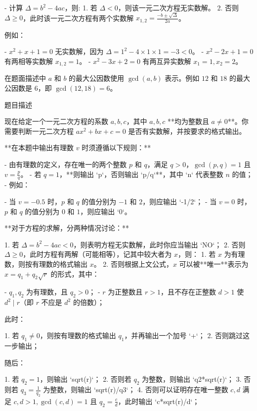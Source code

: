 \documentclass[12pt,twiside,a4paper]{ctexbook}
\numberwithin{chapter}{part}
\begin{document}
- 计算 $\Delta = b ^ 2 - 4ac$，则:
	1. 若 $\Delta < 0$，则该一元二次方程无实数解。
  	2. 否则 $\Delta \geq 0$，此时该一元二次方程有两个实数解 $x _ {1, 2} = \frac{-b \pm \sqrt \Delta}{2a}$。
 
例如：

- $x ^ 2 + x + 1 = 0$ 无实数解，因为 $\Delta = 1 ^ 2 - 4 \times 1 \times 1 = -3 < 0$。
- $x ^ 2 - 2x + 1 = 0$ 有两相等实数解 $x _ {1, 2} = 1$。
- $x ^ 2 - 3x + 2 = 0$ 有两互异实数解 $x _ 1 = 1, x _ 2 = 2$。

在题面描述中 $a$ 和 $b$ 的最大公因数使用 $\gcd(a, b)$ 表示。例如 $12$ 和 $18$ 的最大公因数是 $6$，即 $\gcd(12, 18) = 6$。

 题目描述

现在给定一个一元二次方程的系数 $a, b, c$，其中 $a, b, c$ **均为整数且 $a \neq 0$**。你需要判断一元二次方程 $a x ^ 2 + bx + c = 0$ 是否有实数解，并按要求的格式输出。

**在本题中输出有理数 $v$ 时须遵循以下规则：**

- 由有理数的定义，存在唯一的两个整数 $p$ 和 $q$，满足 $q > 0$，$\gcd(p, q) = 1$ 且 $v = \frac pq$。
- 若 $q = 1$，**则输出 `{p}`，否则输出 `{p}/{q}`**，其中 `{n}` 代表整数 $n$ 的值；
- 例如：

	- 当 $v = -0.5$ 时，$p$ 和 $q$ 的值分别为 $-1$ 和 $2$，则应输出 `-1/2`；
   - 当 $v = 0$ 时，$p$ 和 $q$ 的值分别为 $0$ 和 $1$，则应输出 `0`。
   
**对于方程的求解，分两种情况讨论：**

1. 若 $\Delta = b ^ 2 - 4ac < 0$，则表明方程无实数解，此时你应当输出 `NO`；
2. 否则 $\Delta \geq 0$，此时方程有两解（可能相等），记其中较大者为 $x$，则：
	1. 若 $x$ 为有理数，则按有理数的格式输出 $x$。
   2. 否则根据上文公式，$x$ 可以被**唯一**表示为 $x = q _ 1 + q _ 2 \sqrt r$ 的形式，其中：
   
   		- $q _ 1, q _ 2$ 为有理数，且 $q _ 2 > 0$；
      - $r$ 为正整数且 $r > 1$，且不存在正整数 $d > 1$ 使 $d ^ 2 \mid r$（即 $r$ 不应是 $d ^ 2$ 的倍数）；
   
   此时：
   
   1. 若 $q _ 1 \neq 0$，则按有理数的格式输出 $q _ 1$，并再输出一个加号 `+`；
   2. 否则跳过这一步输出；
   
   随后：
   
   1. 若 $q _ 2 = 1$，则输出 `sqrt({r})`；
   2. 否则若 $q _ 2$ 为整数，则输出 `{q2}*sqrt({r})`；
   3. 否则若 $q _ 3 = \frac 1{q _ 2}$ 为整数，则输出 `sqrt({r})/{q3}`；
   4. 否则可以证明存在唯一整数 $c, d$ 满足 $c, d > 1, \gcd(c, d) = 1$ 且 $q _ 2 = \frac cd$，此时输出 `{c}*sqrt({r})/{d}`；
   
\end{document}
